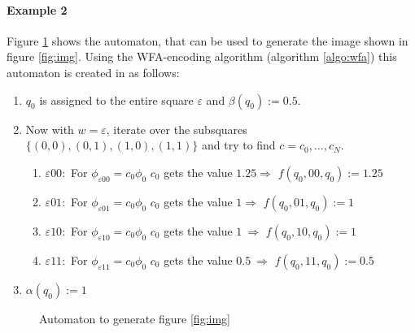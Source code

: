 \documentclass{article}
\begin{document}
\paragraph{Example 2} Figure \ref{fig:automaton} shows the automaton, that can be used to generate the image shown in figure \ref{fig:img}. Using the WFA-encoding algorithm (algorithm \ref{algo:wfa}) this automaton is created in as follows:
\begin{enumerate}
 \item $q_0$ is assigned to the entire square $\varepsilon$ and  $\beta(q_0):= 0.5$.
 \item Now with $w = \varepsilon$, iterate over the subsquares $\{(0,0),(0,1), (1,0), (1,1) \}$ and try to find $c = c_0,\dots,c_N$.
\begin{enumerate}
  \item $\varepsilon 00:$ For $\phi_{\varepsilon00} = c_0\phi_0 $ $c_0$ gets the value $1.25 \Rightarrow$ $f(q_0,00,q_0):= 1.25$
  \item $\varepsilon 01:$ For $\phi_{\varepsilon01} = c_0\phi_0 $ $c_0$ gets the value $1 \Rightarrow$ $f(q_0,01,q_0):= 1$
  \item $\varepsilon 10:$ For $\phi_{\varepsilon10} = c_0\phi_0 $ $c_0$ gets the value $1\ \Rightarrow$ $f(q_0,10,q_0):= 1$
  \item $\varepsilon 11:$ For $\phi_{\varepsilon11} = c_0\phi_0 $ $c_0$ gets the value $0.5\ \Rightarrow$ $f(q_0,11,q_0):= 0.5$
 \end{enumerate}

 
 
\item $\alpha(q_0) := 1$
\end{enumerate}

\begin{figure}[ht]
 \centering
{}
\caption{Automaton to generate figure \ref{fig:img}}
\label{fig:automaton}
\end{figure}
\end{document}

